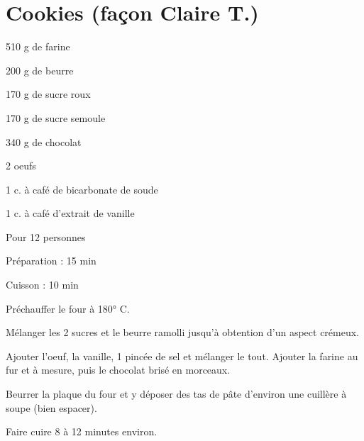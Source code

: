 \section[\normalsize{Cookies (façon Claire T.)}]{Cookies (façon Claire T.)}

\begin{ingredients}
\item 510 g de farine
\item 200 g de beurre
\item 170 g de sucre roux
\item 170 g de sucre semoule
\item 340 g de chocolat
\item 2 oeufs
\item 1 c. \`a caf\'e de bicarbonate de soude
\item 1 c. \`a caf\'e d'extrait de vanille
\end{ingredients}
\begin{infos}
\item Pour 12 personnes
\item Préparation : 15 min
\item Cuisson : 10 min
\end{infos}
\begin{etapes}
\item Pr\'echauffer le four \`a 180° C.
\item M\'elanger les 2 sucres et le beurre ramolli jusqu'\`a 
obtention d'un aspect cr\'emeux.
\item Ajouter l'oeuf, la vanille, 1 pinc\'ee de sel et m\'elanger 
le tout. Ajouter la farine au fur et \`a mesure, puis le chocolat 
bris\'e en morceaux.
\item Beurrer la plaque du four et y d\'eposer des tas de p\^ate 
d'environ une cuill\`ere \`a soupe (bien espacer).
\item Faire cuire 8 \`a 12 minutes environ.
\end{etapes}
\begin{conseils}
\end{conseils}
